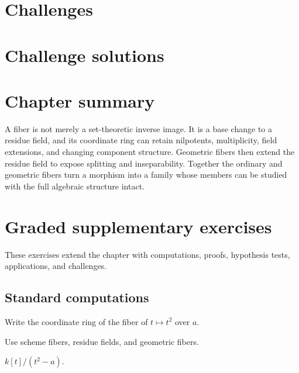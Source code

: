 \section{Challenges}





\ifdefined\IncludeChallengeSolutions
\section{Challenge solutions}

\fi


\section{Chapter summary}
A fiber is not merely a set-theoretic inverse image.  It is a base change to a residue field, and its
coordinate ring can retain nilpotents, multiplicity, field extensions, and changing component
structure.  Geometric fibers then extend the residue field to expose splitting and inseparability.
Together the ordinary and geometric fibers turn a morphism into a family whose members can be
studied with the full algebraic structure intact.


\section{Graded supplementary exercises}
These exercises extend the chapter with computations, proofs, hypothesis tests, applications, and challenges.

\subsection*{Standard computations}

\begin{exercise}\label{exr:vi25-expand-01}
Write the coordinate ring of the fiber of $t\mapsto t^2$ over $a$.
\end{exercise}
\begin{hint}
Use scheme fibers, residue fields, and geometric fibers.
\end{hint}
\begin{solution}
$k[t]/(t^2-a)$.
\end{solution}

